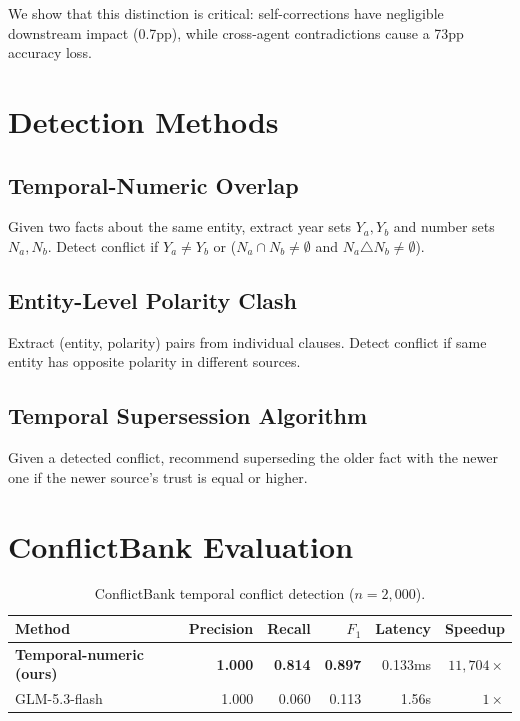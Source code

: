 \documentclass{article}
\begin{document}
We show that this distinction is critical: self-corrections have negligible downstream impact (0.7pp), while cross-agent contradictions cause a 73pp accuracy loss.

\section{Detection Methods}

\subsection{Temporal-Numeric Overlap}
Given two facts about the same entity, extract year sets $Y_a, Y_b$ and number sets $N_a, N_b$. Detect conflict if $Y_a \neq Y_b$ or ($N_a \cap N_b \neq \emptyset$ and $N_a \triangle N_b \neq \emptyset$).

\subsection{Entity-Level Polarity Clash}
Extract (entity, polarity) pairs from individual clauses. Detect conflict if same entity has opposite polarity in different sources.

\subsection{Temporal Supersession Algorithm}
Given a detected conflict, recommend superseding the older fact with the newer one if the newer source's trust is equal or higher.

\section{ConflictBank Evaluation}

\begin{table}[h]
\centering
\caption{ConflictBank temporal conflict detection ($n{=}2{,}000$).}
\begin{tabular}{lrrrrr}
\toprule
Method & Precision & Recall & $F_1$ & Latency & Speedup \\
\midrule
\textbf{Temporal-numeric (ours)} & \textbf{1.000} & \textbf{0.814} & \textbf{0.897} & 0.133ms & $11{,}704\times$ \\
GLM-5.3-flash & 1.000 & 0.060 & 0.113 & 1.56s & $1\times$ \\
\bottomrule
\end{tabular}
\label{tab:cb}
\end{table}
\end{document}
